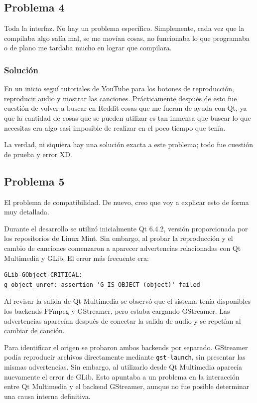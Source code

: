 \documentclass[10pt,a4paper]{article}
\begin{document}
\subsection{Problema 4}
Toda la interfaz. No hay un problema específico. Simplemente, cada vez que la compilaba algo salía mal, se me movían cosas, no funcionaba lo que programaba o de plano me tardaba mucho en lograr que compilara.
\subsubsection{Solución}
En un inicio seguí tutoriales de YouTube para los botones de reproducción, reproducir audio y mostrar las canciones. Prácticamente después de esto fue cuestión de volver a buscar en Reddit cosas que me fueran de ayuda con Qt, ya que la cantidad de cosas que se pueden utilizar es tan inmensa que buscar lo que necesitas era algo casi imposible de realizar en el poco tiempo que tenía.

La verdad, ni siquiera hay una solución exacta a este problema; todo fue cuestión de prueba y error XD.

\subsection{Problema 5}
El problema de compatibilidad. De nuevo, creo que voy a explicar esto de forma muy detallada.

Durante el desarrollo se utilizó inicialmente Qt 6.4.2, versión proporcionada por los repositorios de Linux Mint. Sin embargo, al probar la reproducción y el cambio de canciones comenzaron a aparecer advertencias relacionadas con Qt Multimedia y GLib. El error más frecuente era:
\begin{verbatim}
GLib-GObject-CRITICAL:
g_object_unref: assertion 'G_IS_OBJECT (object)' failed
\end{verbatim}

Al revisar la salida de Qt Multimedia se observó que el sistema tenía disponibles los backends FFmpeg y GStreamer, pero estaba cargando GStreamer. Las advertencias aparecían después de conectar la salida de audio y se repetían al cambiar de canción.

Para identificar el origen se probaron ambos backends por separado. GStreamer podía reproducir archivos directamente mediante \texttt{gst-launch}, sin presentar las mismas advertencias. Sin embargo, al utilizarlo desde Qt Multimedia aparecía nuevamente el error de GLib. Esto apuntaba a un problema en la interacción entre Qt Multimedia y el backend GStreamer, aunque no fue posible determinar una causa interna definitiva.
\end{document}
